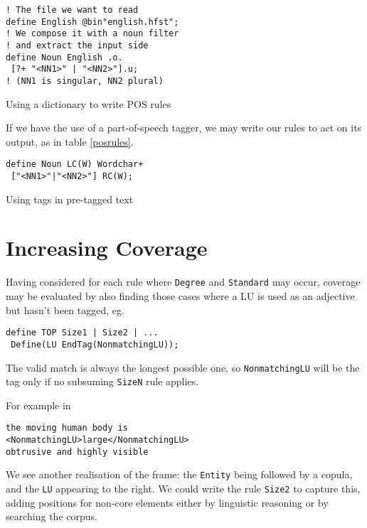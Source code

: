 \documentclass[11pt]{article}
\begin{document}
\begin{table}[h]
\small
  \begin{framed}
\begin{verbatim}
! The file we want to read
define English @bin"english.hfst";
! We compose it with a noun filter
! and extract the input side
define Noun English .o.
 [?+ "<NN1>" | "<NN2>"].u;
! (NN1 is singular, NN2 plural)
\end{verbatim}
\end{framed}
  \normalsize
  \caption{Using a dictionary to write POS rules}
  \label{dictrules}
  \end{table}

If we have the use of a part-of-speech tagger, we may write our rules to act
on its output, as in table \ref{posrules}.

\begin{table}[h]
  \small
  \begin{framed}
\begin{verbatim}
define Noun LC(W) Wordchar+
 ["<NN1>"|"<NN2>"] RC(W);
\end{verbatim}
\end{framed}
  \normalsize
  \caption{Using tags in pre-tagged text}
  \label{posrules}
  \end{table}

\section{Increasing Coverage}
Having considered for each rule where \verb+Degree+ and \verb+Standard+ may occur, coverage may be evaluated by also finding those cases where a LU is used as an adjective but hasn't been tagged, eg.

\small
\begin{verbatim}
define TOP Size1 | Size2 | ...
 Define(LU EndTag(NonmatchingLU));
\end{verbatim}
\normalsize

The valid match is always the longest possible one, so \verb+NonmatchingLU+ will be the tag only if no subsuming \verb+SizeN+ rule applies.

For example in

\small
\begin{verbatim}
the moving human body is
<NonmatchingLU>large</NonmatchingLU>
obtrusive and highly visible
\end{verbatim}
\normalsize

We see another realisation of the frame: the \verb+Entity+ being followed by a
copula, and the \verb+LU+ appearing to the right. We could write the rule
\verb+Size2+ to capture this, adding positions for non-core elements either by
linguistic reasoning or by searching the corpus.



\end{document}
